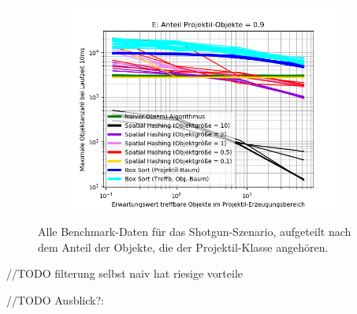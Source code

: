 \begin{figure}
\begin{subfigure}[t]{0.55\textwidth}
		\label{fig:shotgunComparison-D}
	\end{subfigure}
~
	\begin{subfigure}[t]{0.55\textwidth}
		\centering
		\includegraphics[width=1\textwidth]{./res/shotgunComparison-E.png}

		\label{fig:shotgunComparison-E}
	\end{subfigure}

	\caption{Alle Benchmark-Daten für das Shotgun-Szenario, aufgeteilt nach dem Anteil der Objekte, die der Projektil-Klasse angehören.}
	\label{fig:shotgunComparison}
\end{figure}

//TODO filterung selbst naiv hat riesige vorteile

//TODO Ausblick?:



